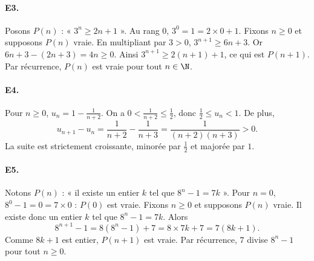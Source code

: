 \paragraph{E3.}Posons $P(n)$ : « $3^n\ge2n+1$ ». Au rang $0$, $3^0=1=2\times0+1$.
Fixons $n\ge0$ et supposons $P(n)$ vraie. En multipliant par $3>0$, $3^{n+1}\ge6n+3$. Or $6n+3-(2n+3)=4n\ge0$. Ainsi $3^{n+1}\ge2(n+1)+1$, ce qui est $P(n+1)$. Par récurrence, $P(n)$ est vraie pour tout $n\in\N$.

\paragraph{E4.}Pour $n\ge0$, $u_n=1-\frac{1}{n+2}$. On a $0<\frac{1}{n+2}\le\frac{1}{2}$, donc $\frac{1}{2}\le u_n<1$. De plus,
\[u_{n+1}-u_n=\frac1{n+2}-\frac1{n+3}=\frac1{(n+2)(n+3)}>0.\]
La suite est strictement croissante, minorée par $\frac{1}{2}$ et majorée par $1$.

\paragraph{E5.}Notons $P(n)$ : « il existe un entier $k$ tel que $8^n-1=7k$ ». Pour $n=0$, $8^0-1=0=7\times0$ : $P(0)$ est vraie.
Fixons $n\ge0$ et supposons $P(n)$ vraie. Il existe donc un entier $k$ tel que $8^n-1=7k$. Alors
\[8^{n+1}-1=8(8^n-1)+7=8\times7k+7=7(8k+1).\]
Comme $8k+1$ est entier, $P(n+1)$ est vraie. Par récurrence, $7$ divise $8^n-1$ pour tout $n\ge0$.

